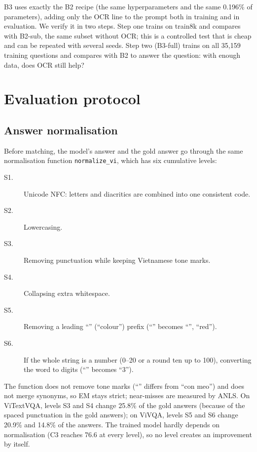 B3 uses exactly the B2 recipe (the same hyperparameters and the same 0.196\% of
parameters), adding only the OCR line to the prompt both in training and in evaluation.
We verify it in two steps. Step one trains on train8k and compares with B2-sub,
the same subset without OCR; this is a controlled test that is cheap and can be repeated
with several seeds. Step two (B3-full) trains on all 35,159 training questions and
compares with B2 to answer the question: with enough data, does OCR still help?

\section{Evaluation protocol}
\label{sec:met-eval}

\subsection{Answer normalisation}
\label{sec:met-norm}

Before matching, the model's answer and the gold answer go through the same
normalisation function \texttt{normalize\_vi}, which has six cumulative levels:

\begin{description}
  \item[S1.] Unicode NFC: letters and diacritics are combined into one consistent code.
  \item[S2.] Lowercasing.
  \item[S3.] Removing punctuation while keeping Vietnamese tone marks.
  \item[S4.] Collapsing extra whitespace.
  \item[S5.] Removing a leading ``'' (``colour'') prefix (``'' becomes
  ``'', ``red'').
  \item[S6.] If the whole string is a number (0--20 or a round ten up to 100), converting
  the word to digits (``'' becomes ``3'').
\end{description}

The function does not remove tone marks (``'' differs from ``con meo'') and
does not merge synonyms, so EM stays strict; near-misses are measured by ANLS. On
ViTextVQA, levels S3 and S4 change 25.8\% of the gold answers (because of the spaced
punctuation in the gold answers); on ViVQA, levels S5 and S6 change 20.9\% and 14.8\% of
the answers. The trained model hardly depends on normalisation (C3 reaches 76.6 at every
level), so no level creates an improvement by itself.

